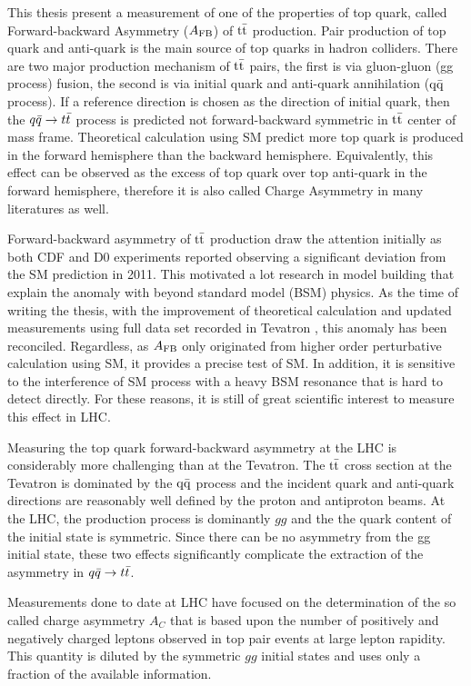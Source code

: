 This thesis present a measurement of one of the properties of top quark, called Forward-backward Asymmetry ($A_{\mathrm{FB}}$) of $\mathrm{t}\bar{\mathrm{t}}$ production. Pair production of top quark and anti-quark is the main source of top quarks in hadron colliders. There are two major production mechanism of $\mathrm{t}\bar{\mathrm{t}}$ pairs, the first is via gluon-gluon (gg process) fusion, the second is via initial quark and anti-quark annihilation ($\mathrm{q \bar{q}}$ process). If a reference direction is chosen as the direction of initial quark, then the $q\bar q \rightarrow t \bar t$ process is predicted not forward-backward symmetric in $\mathrm{t}\bar{\mathrm{t}}$ center of mass frame. Theoretical calculation using SM predict more top quark is produced in the forward hemisphere than the backward hemisphere. Equivalently, this effect can be observed as the excess of top quark over top anti-quark in the forward hemisphere, therefore it is also called Charge Asymmetry in many literatures as well. 

Forward-backward asymmetry of $\mathrm{t}\bar{\mathrm{t}}$ production draw the attention initially as both CDF and D0 experiments \cite{cdf,d0} reported observing a significant deviation from the SM prediction \cite{Kuhn:1998kw, Kuhn:2011ri, AguilarSaavedra:2012rx} in 2011. This motivated a lot research in model building that explain the anomaly with beyond standard model (BSM) physics. As the time of writing the thesis, with the improvement of theoretical calculation and updated measurements using full data set recorded in Tevatron \cite{Abazov:2014cca,CDF2016,tevatron_combine} , this anomaly has been reconciled. Regardless, as $A_{\mathrm{FB}}$ only originated from higher order perturbative calculation using SM, it provides a precise test of SM. In addition, it is sensitive to the interference of SM process with a heavy BSM resonance that is hard to detect directly. For these reasons, it is still of great scientific interest to measure this effect in LHC.

Measuring the top quark forward-backward asymmetry at the LHC is considerably more challenging than at the Tevatron.  The $\mathrm{t}\bar{\mathrm{t}}$ cross section at the Tevatron is dominated by the $\mathrm{q \bar{q}}$ process and the incident quark and anti-quark directions are reasonably well defined by the proton and antiproton beams. At the LHC, the production process is dominantly $gg$ and the the quark content of the initial state is symmetric. Since there can be no asymmetry from the gg initial state, these two effects significantly complicate the extraction of the asymmetry in $q\bar q \rightarrow t \bar t$.  


Measurements \cite{ATLAS_measurement,CMS_measurement,Aad:2016ove,Sirunyan:2017lvd} done to date at LHC have focused on the determination of the so called charge asymmetry $A_C$ that is based upon the number of positively and negatively charged leptons observed in top pair events at large lepton rapidity. This quantity is diluted by the symmetric $gg$ initial states and uses only a fraction of the available information. 


